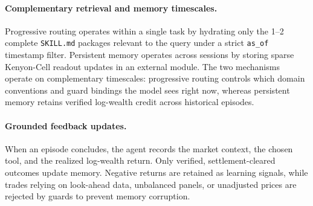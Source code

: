 \paragraph{Complementary retrieval and memory timescales.}
Progressive routing operates within a single task by hydrating only the 1--2 complete
\texttt{SKILL.md} packages relevant to the query under a strict \texttt{as\_of} timestamp filter.
Persistent memory operates across sessions by storing sparse Kenyon-Cell readout updates in an
external module. The two mechanisms operate on complementary timescales: progressive routing
controls which domain conventions and guard bindings the model sees right now, whereas persistent
memory retains verified log-wealth credit across historical episodes.

\paragraph{Grounded feedback updates.}
When an episode concludes, the agent records the market context, the chosen tool, and the
realized log-wealth return. Only verified, settlement-cleared outcomes update memory. Negative returns
are retained as learning signals, while trades relying on look-ahead data, unbalanced panels, or
unadjusted prices are rejected by guards to prevent memory corruption.

